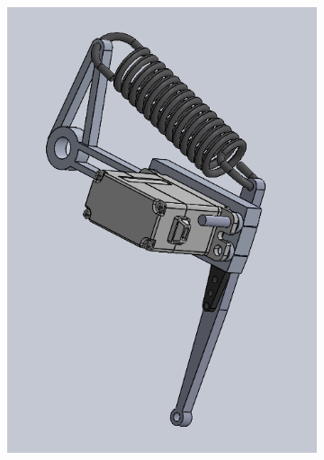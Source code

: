 \begin{figure}[h!]
    \centering
    \begin{subfigure}[b]{0.45\textwidth}
        \includegraphics[width=\textwidth]{Images/extension_spring_outside.png}


\end{subfigure}
\end{figure}

